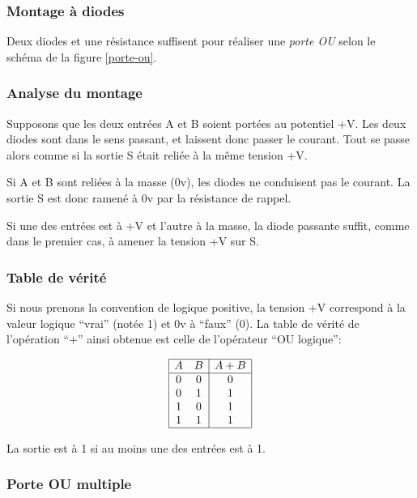 \subsubsection{Montage \`a diodes}

Deux diodes et une r\'esistance suffisent pour r\'ealiser une {\em porte OU}
selon le sch\'ema de la figure \ref{porte-ou}.



\subsubsection{Analyse du montage}


Supposons que les deux entr\'ees A et B soient port\'ees au potentiel
+V.  Les deux diodes sont dans le sens passant, et laissent donc passer le
courant.  Tout se passe alors comme si la sortie S \'etait reli\'ee \`a
la m\^eme tension +V.

Si A et B sont reli\'ees  \`a la masse (0v), les diodes ne conduisent pas 
le courant. La sortie S est donc ramen\'e \`a 0v par 
la r\'esistance de rappel.

Si une des entr\'ees est  \`a +V et l'autre  \`a la masse, la diode passante
suffit, comme dans le premier cas, \`a amener la tension +V sur S.


\subsubsection{Table de v\'erit\'e}

Si nous prenons la convention de logique positive, la tension +V correspond
\`a la valeur logique ``vrai'' (not\'ee 1) et 0v \`a ``faux'' (0). La table
de v\'erit\'e de l'op\'eration ``$+$'' ainsi obtenue est celle de 
l'op\'erateur ``OU logique'':


$$ \begin{array}{|cc|c|}
\hline
A & B & A+B \\
\hline
0 & 0 & 0 \\
0 & 1 & 1 \\
1 & 0 & 1 \\
1 & 1 & 1 \\
\hline
\end{array} $$

La sortie est \`a 1 si au moins une des entr\'ees est \`a 1.
\subsubsection{Porte OU multiple}

